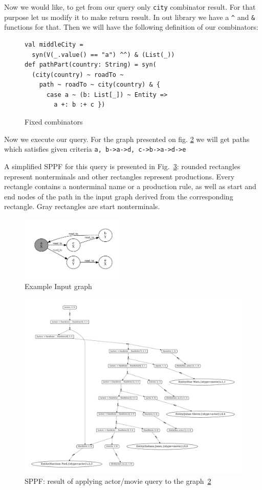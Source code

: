 Now we would like, to get from our query only \lstinline{city} combinator result. For that purpose let us modify it to make return result. In out library we have a \lstinline{^} and \lstinline{&} functions for that. Then we will have the following definition of our combinators:
\begin{figure}[h]
\begin{lstlisting}
val middleCity = 
  syn(V(_.value() == "a") ^^) & (List(_))
def pathPart(country: String) = syn(
  (city(country) ~ roadTo ~ 
    path ~ roadTo ~ city(country) & {
      case a ~ (b: List[_]) ~ Entity => 
        a +: b :+ c })
\end{lstlisting}
\caption{Fixed combinators}
\label{fig:fixedAtor}
\end{figure}

Now we execute our query. For the graph presented on fig. \ref{fig:graph} we will get paths which satisfies given criteria \lstinline{a, b->a->d, c->b->a->d->e}

A simplified SPPF for this query is presented in Fig.~\ref{fig:sppf}: rounded rectangles represent nonterminals and other rectangles represent productions. 
Every rectangle contains a nonterminal name or a production rule, as well as start and end nodes of the path in the input graph derived from the corresponding rectangle. 
Gray rectangles are start nonterminals.

\begin{figure}[h]
\includegraphics[width=0.45\textwidth]{graph}
\caption{Example Input graph}
\label{fig:graph}
\end{figure}

\begin{figure}[h]
\includegraphics[scale=0.5]{sppf}
\caption{SPPF: result of applying actor/movie query to the graph~\ref{fig:graph}}
\label{fig:sppf}
\end{figure}
